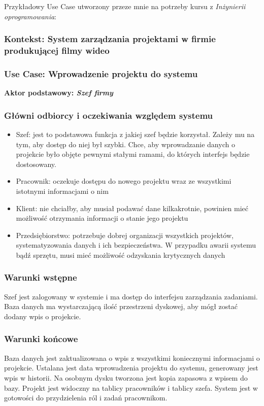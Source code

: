 \documentclass{article}
\begin{document}
Przykładowy Use Case utworzony przeze mnie na potrzeby kursu z \textit{Inżynierii oprogramowania}:
\begin{tcolorbox}
    \subsubsection*{Kontekst: System zarządzania projektami w firmie produkującej filmy wideo}
    \subsubsection*{Use Case: Wprowadzenie projektu do systemu}
    \textbf{Aktor podstawowy: \textit{Szef firmy}}

    \subsubsection*{Główni odbiorcy i oczekiwania względem systemu}
    \begin{itemize}
        \item Szef: jest to podstawowa funkcja z jakiej szef będzie korzystał. Zależy mu na tym, aby dostęp do niej był szybki. Chce, aby wprowadzanie danych o projekcie było objęte pewnymi stałymi ramami, do których interfejs będzie dostosowany.
        \item Pracownik: oczekuje dostępu do nowego projektu wraz ze wszystkimi istotnymi informacjami o nim
        \item Klient: nie chciałby, aby musiał podawać dane kilkakrotnie, powinien mieć możliwość otrzymania informacji o stanie jego projektu
        \item Przedsiębiorstwo: potrzebuje dobrej organizacji wszystkich projektów, systematyzowania danych i ich bezpieczeństwa. W przypadku awarii systemu bądź sprzętu, musi mieć możliwość odzyskania krytycznych danych
    \end{itemize}

    \subsubsection*{Warunki wstępne}
    Szef jest zalogowany w systemie i ma dostęp do interfejsu zarządzania zadaniami. Baza danych ma wystarczającą ilość przestrzeni
    dyskowej, aby mógł zostać dodany wpis o projekcie.

    \subsubsection*{Warunki końcowe}
    Baza danych jest zaktualizowana o wpis z wszystkimi koniecznymi informacjami o projekcie. Ustalana
    jest data wprowadzenia projektu do systemu, generowany jest wpis w historii. Na osobnym dysku tworzona jest
    kopia zapasowa z wpisem do bazy. Projekt jest widoczny na tablicy pracowników i tablicy szefa. System jest w
    gotowości do przydzielenia ról i zadań pracownikom.


\end{tcolorbox}
\end{document}
